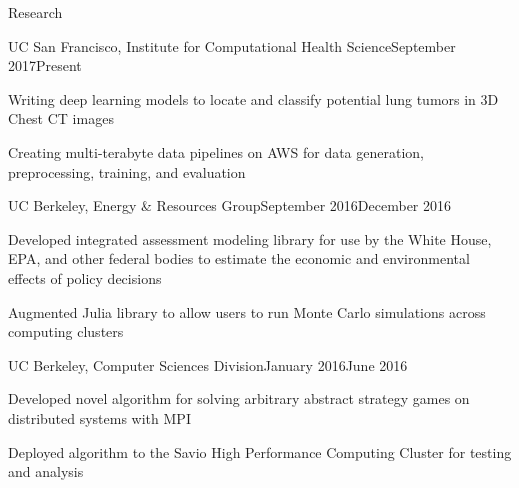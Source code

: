 \documentclass{resume} %
\begin{document}
\begin{rSection}{Research}
\begin{rSubsection}{UC San Francisco,  Institute for Computational Health Science}{September 2017\textminus Present}{}{}
\item[] Writing deep learning models to locate and classify potential lung tumors in 3D Chest CT images
\item[] Creating multi-terabyte data pipelines on AWS for data generation, preprocessing, training, and evaluation
\end{rSubsection}
\begin{rSubsection}{UC Berkeley, Energy \& Resources Group}{September 2016\textminus December 2016}{}{}
\item[] Developed integrated assessment modeling library for use by the White House, EPA, and other federal bodies to estimate the economic and environmental effects of policy decisions 
\item[] Augmented Julia library to allow users to run Monte Carlo simulations across computing clusters
\end{rSubsection}
\begin{rSubsection}{UC Berkeley, Computer Sciences Division}{January 2016\textminus June 2016}{}{}
\item[] Developed novel algorithm for solving arbitrary abstract strategy games on distributed systems with MPI
\item[] Deployed algorithm to the Savio High Performance Computing Cluster for testing and analysis
\end{rSubsection}
\end{rSection}






\end{document}
